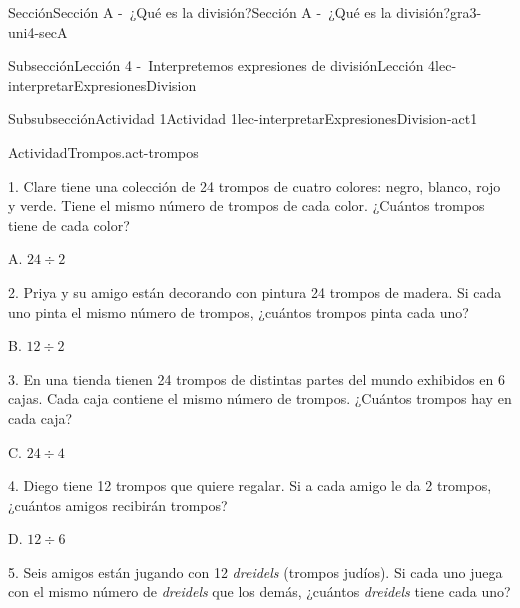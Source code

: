 \documentclass[twoside,10pt,]{article}
\begin{document}
\begin{sectionptx}{Sección}{Sección A -~¿Qué es la división?}{}{Sección A -~¿Qué es la división?}{}{}{gra3-uni4-secA}
\begin{subsectionptx}{Subsección}{Lección 4 -~Interpretemos expresiones de división}{}{Lección 4}{}{}{lec-interpretarExpresionesDivision}
\begin{subsubsectionptx}{Subsubsección}{Actividad 1}{}{Actividad 1}{}{}{lec-interpretarExpresionesDivision-act1}
\begin{activity}{Actividad}{Trompos.}{act-trompos}
\begin{sidebyside}{2}{0.05}{0}{0.15}
\begin{sbspanel}{0.6}
1. Clare tiene una colección de 24 trompos de cuatro colores: negro, blanco, rojo y verde. Tiene el mismo número de trompos de cada color. ¿Cuántos trompos tiene de cada color?%
\end{sbspanel}%
\begin{sbspanel}{0.2}%
\par
A. \(24 \div 2\)%
\end{sbspanel}%
\end{sidebyside}%
\begin{sidebyside}{2}{0.05}{0}{0.15}%
\begin{sbspanel}{0.6}%
2. Priya y su amigo están decorando con pintura 24 trompos de madera. Si cada uno pinta el mismo número de trompos, ¿cuántos trompos pinta cada uno?%
\end{sbspanel}%
\begin{sbspanel}{0.2}%
\par
B. \(12 \div 2\)%
\end{sbspanel}%
\end{sidebyside}%
\begin{sidebyside}{2}{0.05}{0}{0.15}%
\begin{sbspanel}{0.6}%
3. En una tienda tienen 24 trompos de distintas partes del mundo exhibidos en 6 cajas. Cada caja contiene el mismo número de trompos. ¿Cuántos trompos hay en cada caja?%
\end{sbspanel}%
\begin{sbspanel}{0.2}%
\par
C. \(24 \div 4\)%
\end{sbspanel}%
\end{sidebyside}%
\begin{sidebyside}{2}{0.05}{0}{0.15}%
\begin{sbspanel}{0.6}%
4. Diego tiene 12 trompos que quiere regalar. Si a cada amigo le da 2 trompos, ¿cuántos amigos recibirán trompos?%
\end{sbspanel}%
\begin{sbspanel}{0.2}%
\par
D. \(12 \div 6\)%
\end{sbspanel}%
\end{sidebyside}%
\begin{sidebyside}{2}{0.05}{0}{0.15}%
\begin{sbspanel}{0.6}%
5. Seis amigos están jugando con 12 \emph{dreidels} (trompos judíos). Si cada uno juega con el mismo número de \emph{dreidels} que los demás, ¿cuántos \emph{dreidels} tiene cada uno?%
\end{sbspanel}%

\end{sidebyside}
\end{activity}
\end{subsubsectionptx}
\end{subsectionptx}
\end{sectionptx}
\end{document}
